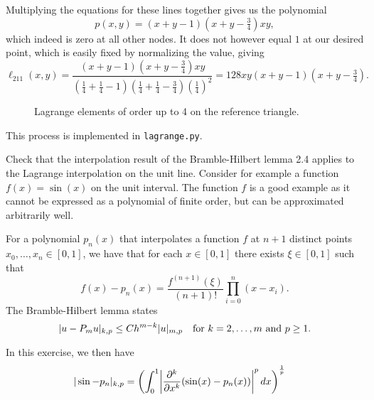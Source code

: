 \begin{solution}
    Multiplying the equations for these lines together gives us the polynomial
    \begin{equation*}
        p(x, y) = (x + y - 1)\left(x + y - \tfrac{3}{4}\right)xy,
    \end{equation*}
    which indeed is zero at all other nodes.
    It does not however equal $1$ at our desired point, which is easily fixed by normalizing the value, giving
    \begin{equation*}
        \ell_{211}(x, y) = \frac{
            (x + y - 1)\left(x + y - \tfrac{3}{4}\right)xy
        }{
            \left(\frac{1}{4} + \frac{1}{4} - 1\right)\left(\frac{1}{4} + \frac{1}{4} - \frac{3}{4}\right)\left(\frac{1}{4}\right)^2
        }
        = 128xy(x + y - 1)\left(x + y - \tfrac{3}{4}\right).
    \end{equation*}

    \begin{figure}[!h]
        \centering
        
        \caption{Lagrange elements of order up to 4 on the reference triangle.\label{fig:lagrange_elements_2}}
    \end{figure}

    This process is implemented in \verb|lagrange.py|.
\end{solution}

\begin{exercise}
    Check that the interpolation result of the Bramble-Hilbert lemma 2.4 applies to the Lagrange interpolation on the unit line.
    Consider for example a function $f(x) = \sin(x)$ on the unit interval.
    The function $f$ is a good example as it cannot be expressed as a polynomial of finite order, but can be approximated arbitrarily well.
\end{exercise}

\begin{solution}
    For a polynomial $p_n(x)$ that interpolates a function $f$ at $n + 1$ distinct points $x_0, \ldots, x_n \in [0, 1]$, we have that for each $x \in [0, 1]$ there exists $\xi \in [0, 1]$ such that
    \begin{equation*}
        f(x) - p_n(x) = \frac{f^{(n+1)}(\xi)}{(n+1)!} \prod_{i=0}^{n} (x - x_i).
    \end{equation*}
    The Bramble-Hilbert lemma states
    \begin{equation*}
        \lvert u - P_m u\rvert_{k,p} \leq C h^{m - k} \lvert u\rvert_{m,p}
        \quad
        \text{for } k = 2, \ldots, m \text{ and } p \geq 1.
    \end{equation*}

    In this exercise, we then have
    \begin{align*}
        |\sin - p_n|_{k, p} &= \left(
            \int_{0}^{1} \abs*{\frac{\partial^k}{\partial x^k}(\sin(x) - p_n(x))}^p \, dx
        \right)^{\frac{1}{p}}
    \end{align*}
\end{solution}
